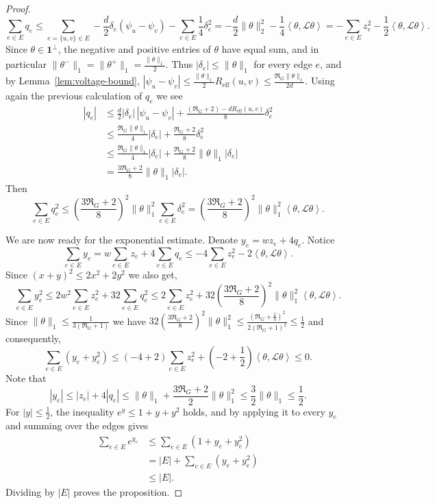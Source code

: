 \documentclass[11pt]{article}
\numberwithin{equation}{section}
\newcommand{\1}{\mathbf{1}}
\newcommand{\ip}[2]{\left\langle #1,#2\right\rangle}
\begin{document}
\begin{proof}
\[
\sum_{e\in E}q_e
\le
\sum_{e=\{u,v\}\in E} -\frac d2  \delta_{e}(\psi_u-\psi_v)
-
\sum_{e\in E} \frac 1 4\delta_e^2
=
-\frac d2\|\theta\|_2^2
-
\frac14\ip{\theta}{\mathcal L\theta}
=
-
\sum_{e\in E}z_e^2
-
\frac12\ip{\theta}{\mathcal L\theta}.
\]
Since $\theta \in \mathbf 1^\perp$, the negative and positive entries of $\theta$ have equal sum, and in particular $\|\theta^-\|_1=\|\theta^+\|_1 = \frac{\|\theta\|_1}{2}$. Thus \(|\delta_e| \le \|\theta\|_1\) for every edge \(e\), and by Lemma~\ref{lem:voltage-bound},
\(
|\psi_u-\psi_v|\le
\frac{\|\theta\|_1}{2}R_{\mathrm{eff}}(u,v)
\le
\frac{\Re_G\|\theta\|_1}{2d}.
\)
Using again the previous calculation of $q_e$ we see
\[
\begin{aligned}
|q_e|
&\le
\frac d2|\delta_e|\,|\psi_u-\psi_v|
+
\frac{(\Re_G+2)-dR_{\mathrm{eff}}(u,v)}{8}\delta_e^2\\
&\le
\frac{\Re_G\|\theta\|_1}{4}|\delta_e|
+
\frac{\Re_G+2}{8}\delta_e^2\\
&\le
\frac{\Re_G\|\theta\|_1}{4}|\delta_e|
+
\frac{\Re_G+2}{8}\|\theta\|_1|\delta_e|\\
&=
\frac{3\Re_G+2}{8}
\|\theta\|_1|\delta_e|.
\end{aligned}
\]
Then
\[
\sum_{e\in E}q_e^2
\le
\left(\frac{3\Re_G+2}{8}\right)^2
\|\theta\|^2_1
\sum_{e\in E}\delta_e^2
=
\left(\frac{3\Re_G+2}{8}\right)^2
\|\theta\|^2_1
\ip{\theta}{\mathcal L\theta}.
\]

We are now ready for the exponential estimate. Denote \(y_e = wz_e+4q_e.\) Notice
\[
\sum_{e\in E}y_e
=
 w\sum_{e\in E}z_e
+
4\sum_{e\in E}q_e
\le
-4\sum_{e\in E}z_e^2
-
2\ip{\theta}{\mathcal L\theta}.
\]
Since \((x+y)^2\le2x^2+2y^2\) we also get,
\[
\sum_{e\in E}y_e^2
\le
2w^2\sum_{e\in E}z_e^2
+
32\sum_{e\in E}q_e^2
\le
2\sum_{e\in E}z_e^2
+32
\left(\frac{3\Re_G+2}{8}\right)^2
\|\theta\|^2_1
\ip{\theta}{\mathcal L\theta}.
\]
Since \(\|\theta\|_1 \le \frac 1{3(\Re_G+1)}\) we have 
\(
32 \left(\frac{3\Re_G+2}{8}\right)^2
\|\theta\|^2_1\le \frac{ (\Re_G+\frac23)^2}{2(\Re_G+1)^2}\le \frac12
\)
and consequently,
\[
\sum_{e\in E}(y_e+y_e^2)
\le
(-4+2)\sum_{e\in E}z_e^2
+
\left(
-2+\frac{1}{2}
\right)
\ip{\theta}{\mathcal L\theta}
\le
0.
\]
Note that
\[
|y_e|
\le
|z_e|+4|q_e|
\le
\|\theta\|_1+\frac{3\Re_G+2}{2} \|\theta\|_1^2
\le
\frac32 \|\theta\|_1\le
\frac12.
\]
For \(|y|\le \frac12\), the inequality \( e^y\le1+y+y^2 \) holds, and by applying it to every \(y_e\) and summing over the edges gives
\[
\begin{aligned}
\sum_{e\in E}e^{y_e}
&\le
\sum_{e\in E}(1+y_e+y_e^2)\\
&=
|E|+
\sum_{e\in E}(y_e+y_e^2)\\
&\le
|E|.
\end{aligned}
\]
Dividing by \(|E|\) proves the proposition.
\end{proof}
\end{document}
